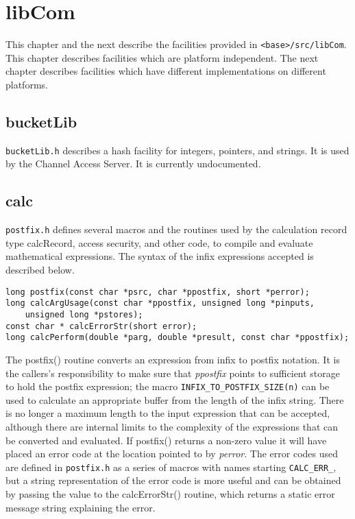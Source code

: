 \chapter{libCom}

This chapter and the next describe the facilities provided in \verb|<base>/src/libCom|.
This chapter describes facilities which are platform independent.
The next chapter describes facilities which have different implementations on different platforms.

\section{bucketLib}

\verb|bucketLib.h| describes a hash facility for integers, pointers, and strings.
It is used by the Channel Access Server.
It is currently undocumented.

\section{calc}

\verb|postfix.h| defines several macros and the routines used by the calculation record type calcRecord, access security, and other code, to compile and evaluate mathematical expressions.
The syntax of the infix expressions accepted is described below.

\begin{verbatim}
long postfix(const char *psrc, char *ppostfix, short *perror);
long calcArgUsage(const char *ppostfix, unsigned long *pinputs,
    unsigned long *pstores);
const char * calcErrorStr(short error);
long calcPerform(double *parg, double *presult, const char *ppostfix);
\end{verbatim}

The postfix() routine converts an expression from infix to postfix notation.
It is the callers's responsibility to make sure that \emph{ppostfix} points to sufficient storage to hold the postfix expression;
the macro \verb|INFIX_TO_POSTFIX_SIZE(n)| can be used to calculate an appropriate buffer from the length of the infix string.
There is no longer a maximum length to the input expression that can be accepted, although there are internal limits to the complexity of the expressions that can be converted and evaluated.
If postfix() returns a non-zero value it will have placed an error code at the location pointed to by \emph{perror}.
The error codes used are defined in \verb|postfix.h| as a series of macros with names starting \verb|CALC_ERR_|, but a string representation of the error code is more useful and can be obtained by passing the value to the calcErrorStr() routine, which returns a static error message string explaining the error.

